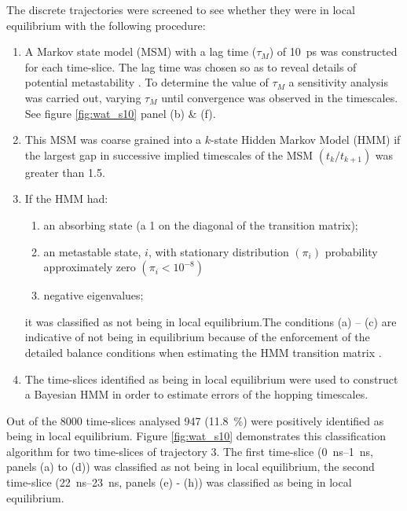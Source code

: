The discrete trajectories were screened to see whether they were in local equilibrium with the following procedure:
\begin{enumerate}
    \item A Markov state model (MSM) with a lag time ($\tau_{M}$) of \SI{10}{\pico\second} was constructed for each time-slice. The lag time was chosen so as to reveal details of potential metastability \cite{prinzMarkovModelsMolecular2011}. To determine the value of $\tau_{M}$  a sensitivity analysis was carried out, varying $\tau_{M}$ until convergence was observed  in the timescales. See figure \ref{fig:wat_s10} panel (b) \& (f).
    \item This MSM was coarse grained into a $k$-state Hidden Markov Model (HMM) if the largest gap in successive implied timescales of the MSM $\left(t_{k} / t_{k+1}\right)$ was greater than \num{1.5}. 
    \item If the HMM had:
    \begin{enumerate}
        \item an absorbing state (a \num{1} on the diagonal of the transition matrix);
        \item an metastable state, $i$, with stationary distribution $\left(\pi_{i}\right)$ probability approximately zero $\left(\pi_{i}< 10^{-8}\right)$
        \item negative eigenvalues; 
    \end{enumerate}
    it was classified as not being in local equilibrium.The conditions (a) – (c) are indicative of not being in equilibrium because of the enforcement of the detailed balance conditions when estimating the HMM transition matrix \cite{noeProjectedHiddenMarkov2013a}.
    \item The time-slices identified as being in local equilibrium were used to construct a Bayesian HMM in order to estimate errors of the hopping timescales. 
\end{enumerate}

Out of the \num{8000} time-slices analysed \num{947} (\SI{11.8}{\percent}) were positively identified as being in local equilibrium. Figure \ref{fig:wat_s10} demonstrates this classification algorithm for two time-slices of trajectory \num{3}. The first time-slice (\SIrange{0}{1}{\nano\second}, panels (a) to (d)) was classified as not being in local equilibrium, the second time-slice (\SIrange{22}{23}{\nano\second}, panels (e) - (h)) was classified as being in local equilibrium.


